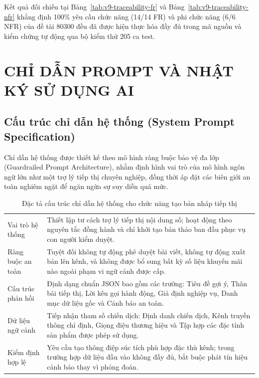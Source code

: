 \noindent Kết quả đối chiếu tại Bảng~\ref{tab:v9-traceability-fr} và Bảng~\ref{tab:v9-traceability-nfr} khẳng định 100\% yêu cầu chức năng (14/14 FR) và phi chức năng (6/6 NFR) của đề tài 80300 đều đã được hiện thực hóa đầy đủ trong mã nguồn và kiểm chứng tự động qua bộ kiểm thử 205 ca test.

\chapter{CHỈ DẪN PROMPT VÀ NHẬT KÝ SỬ DỤNG AI}

\section{Cấu trúc chỉ dẫn hệ thống (System Prompt Specification)}

Chỉ dẫn hệ thống được thiết kế theo mô hình ràng buộc bảo vệ đa lớp (Guardrailed Prompt Architecture), nhằm định hình vai trò của mô hình ngôn ngữ lớn như một trợ lý tiếp thị chuyên nghiệp, đồng thời áp đặt các biên giới an toàn nghiêm ngặt để ngăn ngừa sự suy diễn quá mức.

\begin{table}[H]
\centering
\scriptsize
\renewcommand{\arraystretch}{0.95}
\caption{Đặc tả cấu trúc chỉ dẫn hệ thống cho chức năng tạo bản nháp tiếp thị}
\label{tab:v8-prompt-appendix}
\begin{tabularx}{\textwidth}{|L{2.8cm}|Y|}
\hline
{} & \\
\hline
Vai trò hệ thống & Thiết lập tư cách trợ lý tiếp thị nội dung số; hoạt động theo nguyên tắc đồng hành và chỉ khởi tạo bản thảo ban đầu phục vụ con người kiểm duyệt.\\
\hline
Ràng buộc an toàn & Tuyệt đối không tự động phê duyệt bài viết, không tự động xuất bản lên kênh, và không được bổ sung bất kỳ số liệu khuyến mãi nào ngoài phạm vi ngữ cảnh được cấp.\\
\hline
Cấu trúc phản hồi & Định dạng chuẩn JSON bao gồm các trường: Tiêu đề gợi ý, Thân bài tiếp thị, Lời kêu gọi hành động, Giả định nghiệp vụ, Danh mục dữ liệu gốc và Cảnh báo an toàn.\\
\hline
Dữ liệu ngữ cảnh & Tiếp nhận tham số chiến dịch: Định danh chiến dịch, Kênh truyền thông chỉ định, Giọng điệu thương hiệu và Tập hợp các đặc tính sản phẩm được phép sử dụng.\\
\hline
Kiểm định hợp lệ & Yêu cầu tạo thông điệp súc tích phù hợp đặc thù kênh; trong trường hợp dữ liệu đầu vào không đầy đủ, bắt buộc phát tín hiệu cảnh báo thay vì phỏng đoán.\\
\hline
\end{tabularx}
\end{table}

